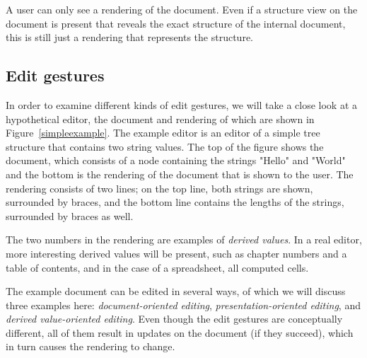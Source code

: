 \documentclass[twoside,epsf]{report}
\begin{document}
A user can only see a rendering of the document. Even if a structure view on the document is present that reveals the exact structure of the internal document, this is still just a rendering that represents the structure.
\subsection{Edit gestures}

\begin{figure}
\end{figure}


In order to examine different kinds of edit gestures, we will take a close look at a hypothetical editor, the document and rendering of which are shown in Figure~\ref{simpleexample}. The example editor is an editor of a simple tree structure that contains two string values. The top of the figure shows the document, which consists of a node containing the strings "Hello" and "World" and the bottom is the rendering of the document that is shown to the user. The rendering consists of two lines; on the top line, both strings are shown, surrounded by braces, and the bottom line contains the lengths of the strings, surrounded by braces as well. 

The two numbers in the rendering are examples of {\em derived values}. In a real editor, more interesting derived values will be present, such as chapter numbers and a table of contents, and in the case of a spreadsheet, all computed cells.

The example document can be edited in several ways, of which we will discuss three examples here: {\em document-oriented editing}, {\em presentation-oriented editing}, and {\em derived value-oriented editing}. Even though the edit gestures are conceptually different, all of them result in updates on the document (if they succeed), which in turn causes the rendering to change.
\end{document}
